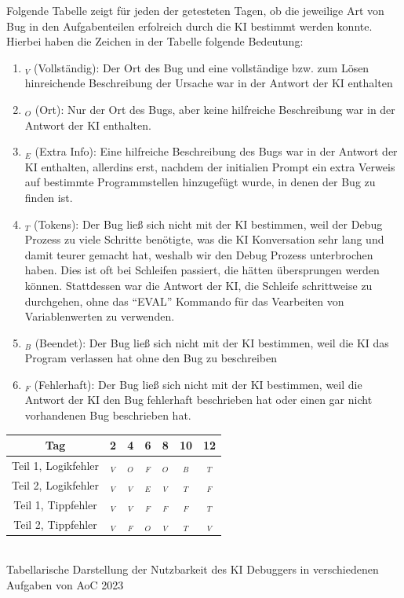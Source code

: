 \documentclass[a4paper,12pt,ngerman]{scrartcl}
\newcommand{\cmark}{\ding{51}}%
\newcommand{\xmark}{\ding{55}}%
\begin{document}
Folgende Tabelle zeigt für jeden der getesteten Tagen, ob die jeweilige Art von Bug in den Aufgabenteilen erfolreich durch die KI bestimmt werden konnte. Hierbei haben die Zeichen in der Tabelle folgende Bedeutung:
\begin{enumerate}
\item \cmark$_V$ (Vollständig): Der Ort des Bug und eine vollständige bzw. zum Lösen hinreichende Beschreibung der Ursache war in der Antwort der KI enthalten
\item \cmark$_O$ (Ort): Nur der Ort des Bugs, aber keine hilfreiche Beschreibung war in der Antwort der KI enthalten.
\item \cmark$_E$ (Extra Info): Eine hilfreiche Beschreibung des Bugs war in der Antwort der KI enthalten, allerdins erst, nachdem der initialien Prompt ein extra Verweis auf bestimmte Programmstellen hinzugefügt wurde, in denen der Bug zu finden ist.
\item \xmark$_T$ (Tokens): Der Bug ließ sich nicht mit der KI bestimmen, weil der Debug Prozess zu viele Schritte benötigte, was die KI Konversation sehr lang und damit teurer gemacht hat, weshalb wir den Debug Prozess unterbrochen haben. Dies ist oft bei Schleifen passiert, die hätten übersprungen werden können. Stattdessen war die Antwort der KI, die Schleife schrittweise zu durchgehen, ohne das ``EVAL'' Kommando für das Vearbeiten von Variablenwerten zu verwenden.
\item \xmark$_B$ (Beendet):   Der Bug ließ sich nicht mit der KI bestimmen, weil die KI das Program verlassen hat ohne den Bug zu beschreiben
\item \xmark$_F$ (Fehlerhaft): Der Bug ließ sich nicht mit der KI bestimmen, weil die Antwort der KI den Bug fehlerhaft beschrieben hat oder einen gar nicht vorhandenen Bug beschrieben hat.
\end{enumerate}
\begin{center}
\begin{tabular}{|c|c|c|c|c|c|c|}
	\hline
 	Tag                 &  2         &  4         &  6         &  8         & 10          & 12         \\
	\hline
	Teil 1, Logikfehler & \cmark$_V$ & \cmark$_O$ & \xmark$_F$ & \cmark$_O$ &  \xmark$_B$ & \xmark$_T$ \\
	Teil 2, Logikfehler & \cmark$_V$ & \cmark$_V$ & \cmark$_E$ & \cmark$_V$ &  \xmark$_T$ & \xmark$_F$ \\
	Teil 1, Tippfehler  & \cmark$_V$ & \cmark$_V$ & \xmark$_F$ & \xmark$_F$ &  \xmark$_F$ & \xmark$_T$ \\
	Teil 2, Tippfehler  & \cmark$_V$ & \xmark$_F$ & \cmark$_O$ & \cmark$_V$ &  \xmark$_T$ & \cmark$_V$ \\
	\hline
\end{tabular}\\
\small{Tabellarische Darstellung der Nutzbarkeit des KI Debuggers in verschiedenen Aufgaben von AoC 2023}
\end{center}
\end{document}

